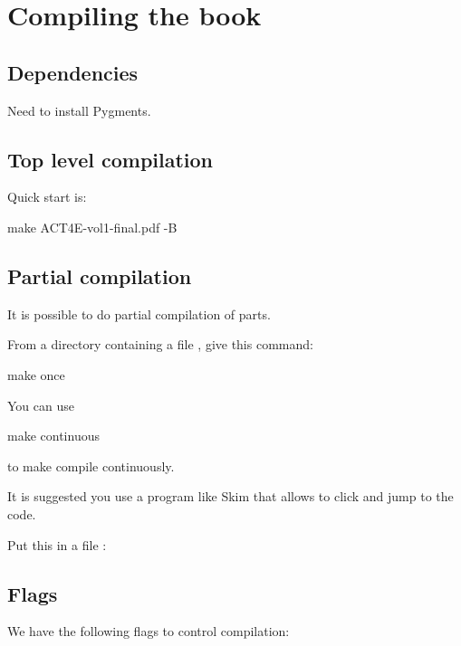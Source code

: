 \section{Compiling the book}

\subsection{Dependencies}

Need to install Pygments.

\subsection{Top level compilation}

Quick start is:


\begin{console}
  make ACT4E-vol1-final.pdf -B
\end{console}

\subsection{Partial compilation}

It is possible to do partial compilation of parts.

From a directory containing a file , give this command:

\begin{console}
  make once
\end{console}

You can use
%
\begin{console}
  make continuous
\end{console}
%
to make  compile continuously.

It is suggested you use a program like Skim that allows to click and jump to the code.

Put this in a file :




\subsection{Flags}

We have the following flags to control compilation:

